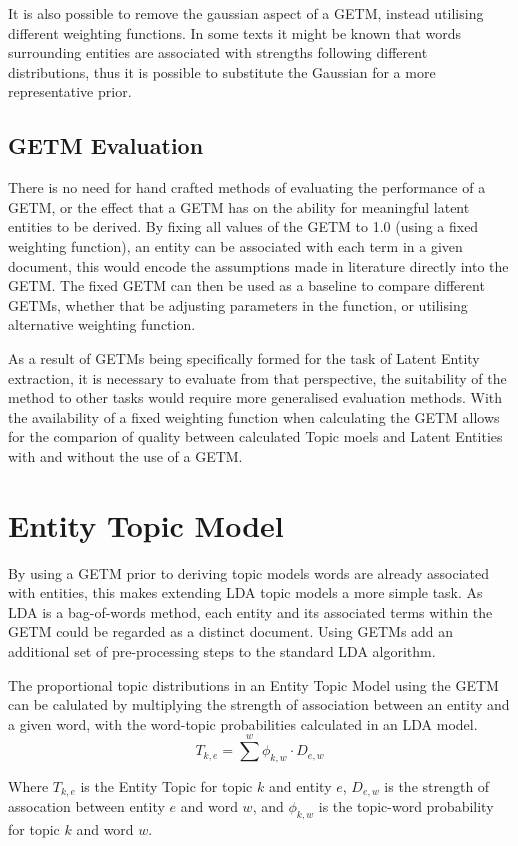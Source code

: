 \documentclass[10pt]{report}
\begin{document}
It is also possible to remove the gaussian aspect of a GETM, instead utilising different weighting functions. In some texts it might be known that words surrounding entities are associated with strengths following different distributions, thus it is possible to substitute the Gaussian for a more representative prior. 

\subsection{GETM Evaluation}
There is no need for hand crafted methods of evaluating the performance of a GETM, or the effect that a GETM has on the ability for meaningful latent entities to be derived. By fixing all values of the GETM to 1.0 (using a fixed weighting function), an entity can be associated with each term in a given document, this would encode the assumptions made in literature directly into the GETM. The fixed GETM can then be used as a baseline to compare different GETMs, whether that be adjusting parameters in the function, or utilising alternative weighting function.

As a result of GETMs being specifically formed for the task of Latent Entity extraction, it is necessary to evaluate from that perspective, the suitability of the method to other tasks would require more generalised evaluation methods. With the availability of a fixed weighting function when calculating the GETM allows for the comparion of quality between calculated Topic moels and Latent Entities with and without the use of a GETM.

\section{Entity Topic Model}
By using a GETM prior to deriving topic models words are already associated with entities, this makes extending LDA topic models a more simple task. As LDA is a bag-of-words method, each entity and its associated terms within the GETM could be regarded as a distinct document. Using GETMs add an additional set of pre-processing steps to the standard LDA algorithm.

The proportional topic distributions in an Entity Topic Model using the GETM can be calulated by multiplying the strength of association between an entity and a given word, with the word-topic probabilities calculated in an LDA model.
\[
  T_{k,e} = \sum^w \phi_{k,w} \cdot D_{e,w}
\]

Where  \(T_{k,e}\) is the Entity Topic for topic \(k\) and entity \(e\), \(D_{e,w}\) is the strength of assocation between entity \(e\) and word \(w\), and \(\phi_{k,w}\) is the topic-word probability for topic \(k\) and word \(w\).
\end{document}
